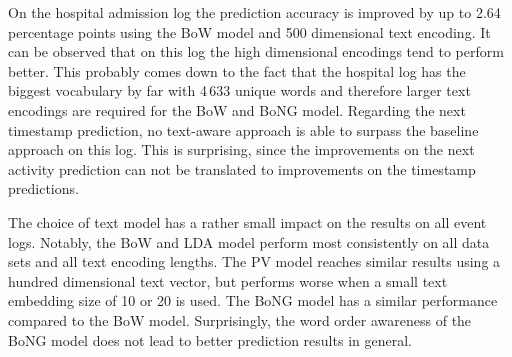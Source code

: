 On the hospital admission log the prediction accuracy is improved by up to 2.64 percentage points using the BoW model and 500 dimensional text encoding.
It can be observed that on this log the high dimensional encodings tend to perform better.
This probably comes down to the fact that the hospital log has the biggest vocabulary by far with 4\,633 unique words and therefore larger text encodings are required for the BoW and BoNG model.
Regarding the next timestamp prediction, no text-aware approach is able to surpass the baseline approach on this log.
This is surprising, since the improvements on the next activity prediction can not be translated to improvements on the timestamp predictions.

The choice of text model has a rather small impact on the results on all event logs.
Notably, the BoW and LDA model perform most consistently on all data sets and all text encoding lengths.
The PV model reaches similar results using a hundred dimensional text vector, but performs worse when a small text embedding size of 10 or 20 is used.
The BoNG model has a similar performance compared to the BoW model.
Surprisingly, the word order awareness of the BoNG model does not lead to better prediction results in general.



